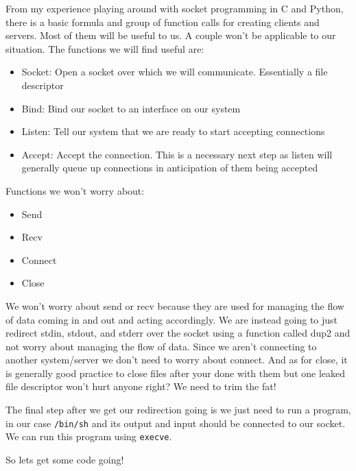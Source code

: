 \documentclass[11pt]{article}
\begin{document}
From my experience playing around with socket programming in C and
Python, there is a basic formula and group of function calls for
creating clients and servers. Most of them will be useful to us. A
couple won't be applicable to our situation.  The functions we will
find useful are:

\begin{itemize}
\item Socket: Open a socket over which we will communicate. Essentially a file descriptor
\item Bind: Bind our socket to an interface on our system
\item Listen: Tell our system that we are ready to start accepting connections
\item Accept: Accept the connection. This is a necessary next step as listen will generally queue up connections in anticipation of them being accepted
\end{itemize}

Functions we won't worry about:

\begin{itemize}
\item Send
\item Recv
\item Connect
\item Close
\end{itemize}

We won't worry about send or recv because they are used for managing
the flow of data coming in and out and acting accordingly.  We are
instead going to just redirect stdin, stdout, and stderr over the
socket using a function called dup2 and not worry about managing the
flow of data. Since we aren't connecting to another system/server we
don't need to worry about connect. And as for close, it is generally
good practice to close files after your done with them but one leaked
file descriptor won't hurt anyone right? We need to trim the fat!

The final step after we get our redirection going is we just need to
run a program, in our case \verb~/bin/sh~ and its output and input should
be connected to our socket. We can run this program using \verb~execve~.

So lets get some code going!
\end{document}
